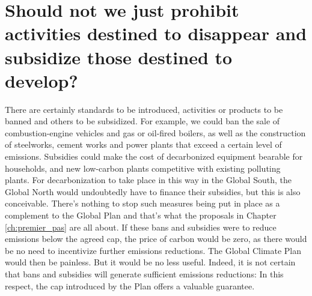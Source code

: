 \documentclass[a5paper,english,openany]{memoir}
\begin{document}
\section*{\normalsize Should not we just %
prohibit activities destined to disappear and subsidize those destined to develop?}\label{q:interdiction}

There are certainly standards to be introduced, activities or products to be banned and others to be subsidized. %
For example, we could ban the sale of combustion-engine vehicles and gas or oil-fired boilers, as well as the construction of steelworks, cement works and power plants that exceed a certain level of emissions. Subsidies could make the cost of decarbonized %
equipment bearable for households, and new low-carbon plants competitive with existing polluting plants. For decarbonization %
to take place in this way in the Global South, the Global North would undoubtedly have to finance their subsidies, but this is also conceivable. There's nothing to stop such measures being put in place as a complement to the Global Plan %
and that's what the proposals in Chapter \ref{ch:premier_pas} are all about. If these bans and subsidies were to reduce emissions below the agreed cap, the price of carbon would be zero, as there would be no need to incentivize %
further emissions reductions. The Global Climate Plan would then be painless. But it would be no less useful. Indeed, it is not certain that bans and subsidies will generate sufficient emissions reductions: In this respect, the cap introduced by the Plan offers a valuable guarantee. %
\end{document}
